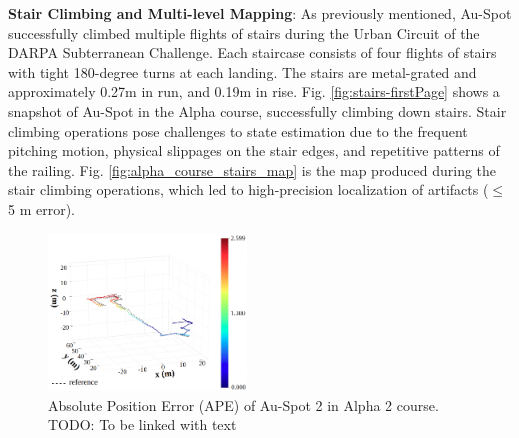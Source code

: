 \documentclass[letterpaper, 10pt, conference]{ieeeconf}      %
\newcommand{\ph}[1]{{\textbf{#1}:}} %
\newcommand{\inst}[1]{{\color{orange} #1 }} %
\newcommand{\rev}[1]{{\color{blue} #1 }} %
\begin{document}


\ph{Stair Climbing and Multi-level Mapping}
\rev{As previously mentioned, Au-Spot successfully climbed multiple flights of stairs during the Urban Circuit of the DARPA Subterranean Challenge.}
Each staircase consists of four flights of stairs with tight 180-degree turns at each landing. 
The stairs are metal-grated and approximately 0.27m in run, and 0.19m in rise. Fig. \ref{fig:stairs-firstPage} shows a snapshot of \rev{Au-Spot in the Alpha course, successfully climbing down stairs.} 
Stair climbing operations pose challenges to state estimation due to the frequent pitching motion, physical slippages on the stair edges, and repetitive patterns of the railing. 
Fig. \ref{fig:alpha_course_stairs_map} is the map produced during the stair climbing operations, which led to high-precision localization of artifacts ($\leq$ 5 m error).



\begin{figure}[thpb]
  \centering
  \includegraphics[width=0.47\textwidth]{spot_iros/graphics/spot2_alpha2_ape.png}
  \caption{\rev{Absolute Position Error (APE) of Au-Spot 2 in Alpha 2 course. TODO: To be linked with text}}
  \label{spot2_alpha2_ape}
\end{figure}

\end{document}
